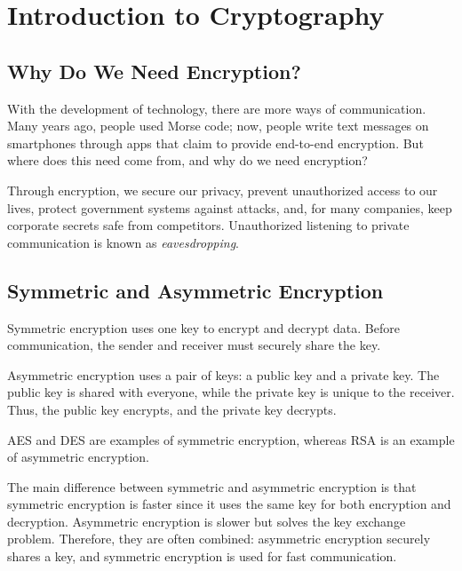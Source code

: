 \section{Introduction to Cryptography}

\subsection{Why Do We Need Encryption?}

With the development of technology, there are more ways of communication. 
Many years ago, people used Morse code; now, people write text messages on smartphones through apps that claim to provide end-to-end encryption. 
But where does this need come from, and why do we need encryption?

\noindent
Through encryption, we secure our privacy, prevent unauthorized access to our lives, protect government systems against attacks, and, for many companies, keep corporate secrets safe from competitors. 
Unauthorized listening to private communication is known as \textit{eavesdropping}.

\subsection{Symmetric and Asymmetric Encryption}

Symmetric encryption uses one key to encrypt and decrypt data. 
Before communication, the sender and receiver must securely share the key.

\noindent
Asymmetric encryption uses a pair of keys: a public key and a private key. 
The public key is shared with everyone, while the private key is unique to the receiver. 
Thus, the public key encrypts, and the private key decrypts.

\noindent
AES and DES are examples of symmetric encryption, whereas RSA is an example of asymmetric encryption.

\noindent
The main difference between symmetric and asymmetric encryption is that symmetric encryption is faster since it uses the same key for both encryption and decryption. 
Asymmetric encryption is slower but solves the key exchange problem. Therefore, they are often combined: asymmetric encryption securely shares a key, and symmetric encryption is used for fast communication.